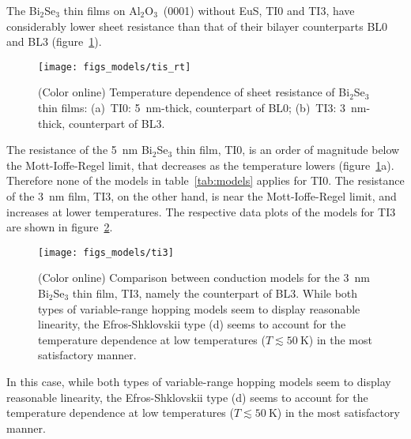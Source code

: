 The Bi$_2$Se$_3$ thin films on Al$_2$O$_3$~(0001) without EuS, TI0 and TI3, have considerably lower sheet resistance than that of their bilayer counterparts BL0 and BL3 (figure~\ref{fig:models_tis_rt}).%
\begin{figure}[ht]%
    \centering%
    \texttt{[image: figs\_models/tis\_rt]}%
    \caption[Temperature dependence of sheet resistance of Bi$_2$Se$_3$ thin films: TI0~\&~TI3]{\label{fig:models_tis_rt}(Color online) Temperature dependence of sheet resistance of Bi$_2$Se$_3$ thin films: (a)~TI0: \SI{5}{nm}-thick, counterpart of BL0; (b)~TI3: \SI{3}{nm}-thick, counterpart of BL3.}%
\end{figure} %
%
The resistance of the \SI{5}{nm} Bi$_2$Se$_3$ thin film, TI0, is an order of magnitude below the Mott-Ioffe-Regel limit, that decreases as the temperature lowers (figure~\ref{fig:models_tis_rt}a). Therefore none of the models in table~\ref{tab:models} applies for TI0. The resistance of the \SI{3}{nm} film, TI3, on the other hand, is near the Mott-Ioffe-Regel limit, and increases at lower temperatures. The respective data plots of the models for TI3 are shown in figure~\ref{fig:models_ti3}.%
\begin{figure}[ht]%
    \centering%
    \texttt{[image: figs\_models/ti3]}%
    \caption[Conduction model comparison: Bi$_2$Se$_3$ thin film: TI3]{\label{fig:models_ti3}(Color online) Comparison between conduction models for the \SI{3}{nm} Bi$_2$Se$_3$ thin film, TI3, namely the counterpart of BL3. While both types of variable-range hopping models seem to display reasonable linearity, the Efros-Shklovskii type (d) seems to account for the temperature dependence at low temperatures ($T \lesssim 50~\mathrm{K}$) in the most satisfactory manner.}%
\end{figure} %
%
In this case, while both types of variable-range hopping models seem to display reasonable linearity, the Efros-Shklovskii type (d) seems to account for the temperature dependence at low temperatures ($T \lesssim 50~\mathrm{K}$) in the most satisfactory manner.

